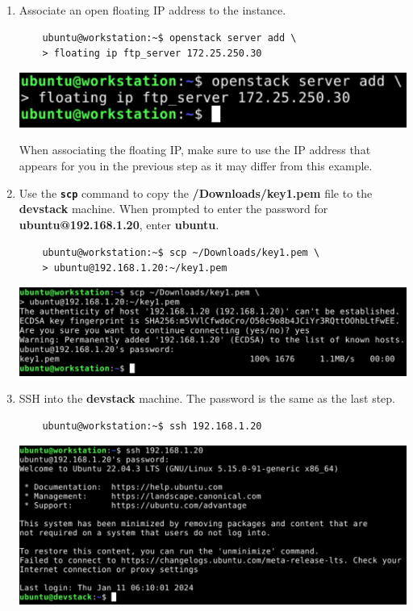\documentclass[letterpaper, 12pt]{article}
\begin{document}
\begin{enumerate}
    \item Associate an open floating IP address to the instance.
    \begin{lstlisting}
    ubuntu@workstation:~$ openstack server add \
    > floating ip ftp_server 172.25.250.30
    \end{lstlisting}

    \begin{center}
        \includegraphics[width=\linewidth]{images/part1/step38.png}
    \end{center}

    \begin{notebox}
        When associating the floating IP, make sure to use the IP address that appears for you in the previous step as
        it may differ from this example.
    \end{notebox}

    \item Use the \textbf{\texttt{scp}} command to copy the \textbf{\texttildemid/Downloads/key1.pem} file to the
    \textbf{devstack} machine. When prompted to enter the password for \textbf{ubuntu@192.168.1.20}, enter
    \textbf{ubuntu}.
    \begin{lstlisting}
    ubuntu@workstation:~$ scp ~/Downloads/key1.pem \
    > ubuntu@192.168.1.20:~/key1.pem
    \end{lstlisting}

    \begin{center}
        \includegraphics[width=\linewidth]{images/part1/step39.png}
    \end{center}

    \item SSH into the \textbf{devstack} machine. The password is the same as the last step.
    \begin{lstlisting}
    ubuntu@workstation:~$ ssh 192.168.1.20
    \end{lstlisting}

    \begin{center}
        \includegraphics[width=\linewidth]{images/part1/step40.png}
    \end{center}


\end{enumerate}
\end{document}

